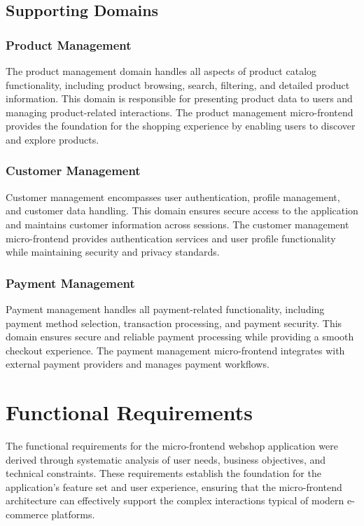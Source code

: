 \documentclass[12pt,a4paper]{report}
\begin{document}
\subsection{Supporting Domains}
\subsubsection{Product Management}

The product management domain handles all aspects of product catalog functionality, including product browsing, search, filtering, and detailed product information. This domain is responsible for presenting product data to users and managing product-related interactions. The product management micro-frontend provides the foundation for the shopping experience by enabling users to discover and explore products.

\subsubsection{Customer Management}

Customer management encompasses user authentication, profile management, and customer data handling. This domain ensures secure access to the application and maintains customer information across sessions. The customer management micro-frontend provides authentication services and user profile functionality while maintaining security and privacy standards.

\subsubsection{Payment Management}

Payment management handles all payment-related functionality, including payment method selection, transaction processing, and payment security. This domain ensures secure and reliable payment processing while providing a smooth checkout experience. The payment management micro-frontend integrates with external payment providers and manages payment workflows.

\section{Functional Requirements}

The functional requirements for the micro-frontend webshop application were derived through systematic analysis of user needs, business objectives, and technical constraints. These requirements establish the foundation for the application's feature set and user experience, ensuring that the micro-frontend architecture can effectively support the complex interactions typical of modern e-commerce platforms.
\end{document}
